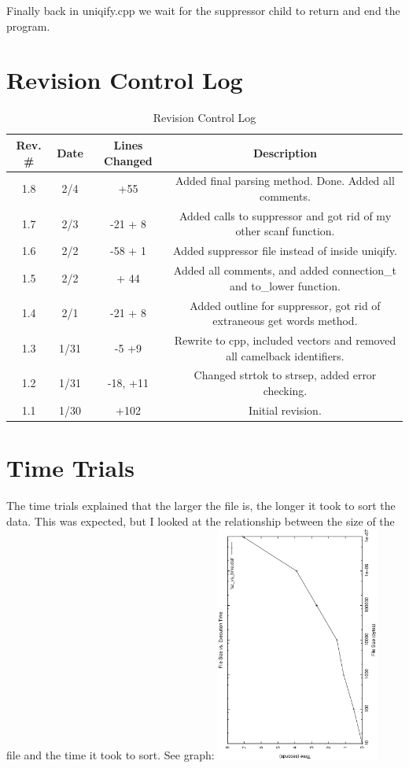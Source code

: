 \documentclass[letterpaper,10pt]{article}
\begin{document}
 Finally back in uniqify.cpp we wait for the suppressor child to return and end the program.
\section{Revision Control Log}
\begin{table}[ht]
\caption{Revision Control Log} %
\centering  %
\begin{tabular}{c c c c} %
\hline\hline                        %
Rev. \# & Date & Lines Changed & Description \\ [0.5ex] %
\hline 
1.8 & 2/4 & +55 & Added final parsing method. Done. Added all comments. \\
1.7 & 2/3  & -21 + 8 & Added calls to suppressor and got rid of my other scanf function. \\ 
1.6 & 2/2 & -58 + 1 & Added suppressor file instead of inside uniqify.  \\
1.5 & 2/2 & + 44 & Added all comments, and added connection\_t and to\_lower function.  \\ 
1.4 & 2/1 & -21 + 8 & Added outline for suppressor,  got rid of extraneous get words method. \\
1.3 & 1/31 & -5 +9 & Rewrite to cpp, included vectors and removed all camelback identifiers. \\
1.2 & 1/31 & -18, +11 & Changed strtok to strsep, added error checking. \\
1.1 & 1/30 & +102 & Initial revision. \\[1.5ex] 
\hline
\end{tabular}
\label{table:nonlin} %
\end{table}


\section{Time Trials}
The time trials explained that the larger the file is, the longer it took to sort the data. This was expected, but I looked at the relationship between the size of the file and the time it took to sort. See graph:
\includegraphics[width=0.4\textwidth]{sz_vs_time.eps}
\end{document}
